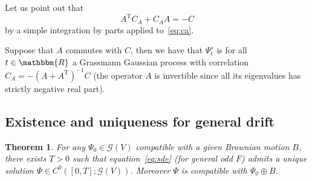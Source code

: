 \documentclass[11pt]{article}
\newcommand{\Tau}{\mathrm{T}}
\newtheorem{theorem}{Theorem}
\begin{document}
Let us point out that
\begin{equation}
  A^{\Tau} C_A + C_A A = - C \label{eq:relation-ca}
\end{equation}
by a simple integration by parts applied to~{\eqref{eq:ca}}.

\begin{remark}
  Suppose that $A$ commutes with $C$, then we have that $\Psi_t^s$ is for all
  $t \in \mathbbm{R}$ a Grassmann Gaussian process with correlation $C_A = - (A
  + A^{\Tau})^{- 1} C$ (the operator $A$ is invertible since all its
  eigenvalues has strictly negative real part).
\end{remark}

\subsection{Existence and uniqueness for general drift}

\begin{theorem}
  \label{theorem_picard}For any $\Psi_0 \in \mathcal{G} (V)$ compatible with a
  given Brownian motion $B$, there exists $T > 0$ such that
  equation~{\eqref{eq:sde}} (for general odd $F$) admits a unique solution
  $\Psi \in C^0 ([0, T] ; \mathcal{G} (V))$. Moreover $\Psi$ is compatible
  with $\Psi_0 \oplus B$.
\end{theorem}
\end{document}
